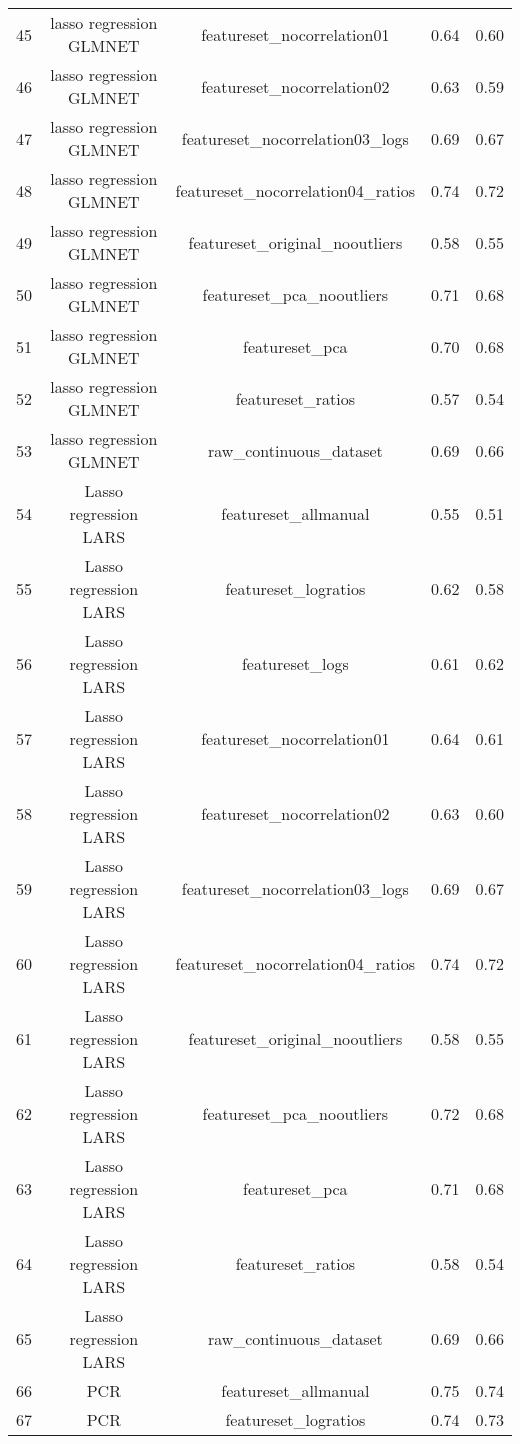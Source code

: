 \begin{tabular}{ccccc}
  45 & lasso regression GLMNET & featureset\_nocorrelation01 & 0.64 & 0.60 \\ 
  46 & lasso regression GLMNET & featureset\_nocorrelation02 & 0.63 & 0.59 \\ 
  47 & lasso regression GLMNET & featureset\_nocorrelation03\_logs & 0.69 & 0.67 \\ 
  48 & lasso regression GLMNET & featureset\_nocorrelation04\_ratios & 0.74 & 0.72 \\ 
  49 & lasso regression GLMNET & featureset\_original\_nooutliers & 0.58 & 0.55 \\ 
  50 & lasso regression GLMNET & featureset\_pca\_nooutliers & 0.71 & 0.68 \\ 
  51 & lasso regression GLMNET & featureset\_pca & 0.70 & 0.68 \\ 
  52 & lasso regression GLMNET & featureset\_ratios & 0.57 & 0.54 \\ 
  53 & lasso regression GLMNET & raw\_continuous\_dataset & 0.69 & 0.66 \\ 
  54 & Lasso regression LARS & featureset\_allmanual & 0.55 & 0.51 \\ 
  55 & Lasso regression LARS & featureset\_logratios & 0.62 & 0.58 \\ 
  56 & Lasso regression LARS & featureset\_logs & 0.61 & 0.62 \\ 
  57 & Lasso regression LARS & featureset\_nocorrelation01 & 0.64 & 0.61 \\ 
  58 & Lasso regression LARS & featureset\_nocorrelation02 & 0.63 & 0.60 \\ 
  59 & Lasso regression LARS & featureset\_nocorrelation03\_logs & 0.69 & 0.67 \\ 
  60 & Lasso regression LARS & featureset\_nocorrelation04\_ratios & 0.74 & 0.72 \\ 
  61 & Lasso regression LARS & featureset\_original\_nooutliers & 0.58 & 0.55 \\ 
  62 & Lasso regression LARS & featureset\_pca\_nooutliers & 0.72 & 0.68 \\ 
  63 & Lasso regression LARS & featureset\_pca & 0.71 & 0.68 \\ 
  64 & Lasso regression LARS & featureset\_ratios & 0.58 & 0.54 \\ 
  65 & Lasso regression LARS & raw\_continuous\_dataset & 0.69 & 0.66 \\ 
  66 & PCR & featureset\_allmanual & 0.75 & 0.74 \\ 
  67 & PCR & featureset\_logratios & 0.74 & 0.73 \\ 

\end{tabular}

